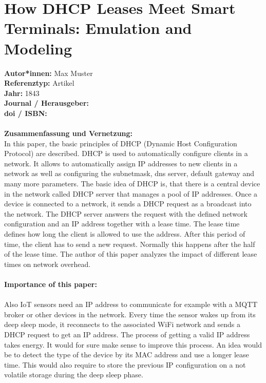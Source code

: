 \documentclass{report}
\begin{document}

{\let\clearpage\relax \chapter{How DHCP Leases Meet Smart Terminals: Emulation and Modeling}}
\noindent
\textbf{Autor*innen:} Max Muster\\
\textbf{Referenztyp:} Artikel\\
\textbf{Jahr:} 1843\\
\textbf{Journal / Herausgeber:}\\
\textbf{doi / ISBN:}\\\\
\textbf{Zusammenfassung und Vernetzung:}\\
In this paper, the basic principles of DHCP (Dynamic Host Configuration Protocol) are described. 
DHCP is used to automatically configure clients in a network. 
It allows to automatically assign IP addresses to new clients in a network as well as configuring the subnetmask, dns server, default gateway and many more parameters.
The basic idea of DHCP is, that there is a central device in the network called DHCP server that manages a pool of IP addresses.
Once a device is connected to a network, it sends a DHCP request as a broadcast into the network. 
The DHCP server answers the request with the defined network configuration and an IP address together with a lease time.
The lease time defines how long the client is allowed to use the address. After this period of time, the client has to send a new request. 
Normally this happens after the half of the lease time.
The author of this paper analyzes the impact of different lease times on network overhead.
\\\\
\textbf{Importance of this paper:}
\\\\
Also IoT sensors need an IP address to communicate for example with a MQTT broker or other devices in the network.
Every time the sensor wakes up from its deep sleep mode, it reconnects to the associated WiFi network and sends a DHCP request to get an IP address.
The process of getting a valid IP address takes energy. It would for sure make sense to improve this process. 
An idea would be to detect the type of the device by its MAC address and use a longer lease time. This would also require to store the previous IP configuration on a not volatile storage during the deep sleep phase.
\end{document}

